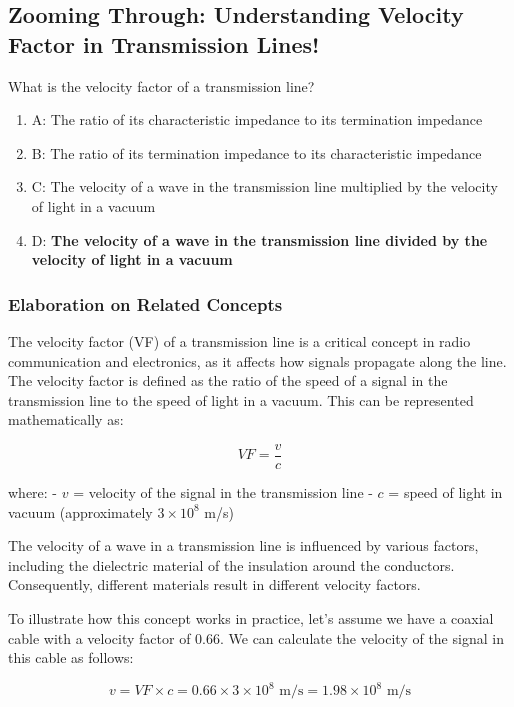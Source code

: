 \subsection{Zooming Through: Understanding Velocity Factor in Transmission Lines!}

\begin{tcolorbox}[colback=gray!10, colframe=black, title=E9F01]
What is the velocity factor of a transmission line?
\begin{enumerate}
    \item A: The ratio of its characteristic impedance to its termination impedance
    \item B: The ratio of its termination impedance to its characteristic impedance
    \item C: The velocity of a wave in the transmission line multiplied by the velocity of light in a vacuum
    \item D: \textbf{The velocity of a wave in the transmission line divided by the velocity of light in a vacuum}
\end{enumerate} \end{tcolorbox}

\subsubsection*{Elaboration on Related Concepts}

The velocity factor (VF) of a transmission line is a critical concept in radio communication and electronics, as it affects how signals propagate along the line. The velocity factor is defined as the ratio of the speed of a signal in the transmission line to the speed of light in a vacuum. This can be represented mathematically as:

\[
VF = \frac{v}{c}
\]

where:
- \( v \) = velocity of the signal in the transmission line
- \( c \) = speed of light in vacuum (approximately \( 3 \times 10^8 \) m/s)

The velocity of a wave in a transmission line is influenced by various factors, including the dielectric material of the insulation around the conductors. Consequently, different materials result in different velocity factors.

To illustrate how this concept works in practice, let’s assume we have a coaxial cable with a velocity factor of 0.66. We can calculate the velocity of the signal in this cable as follows:

\[
v = VF \times c = 0.66 \times 3 \times 10^8 \text{ m/s} = 1.98 \times 10^8 \text{ m/s}
\]

